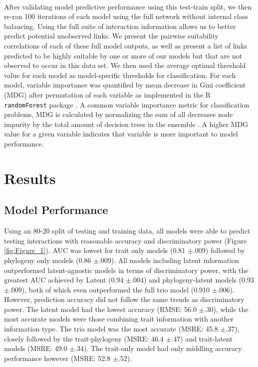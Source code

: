 \documentclass[openacc]{rsproca_new}%
\begin{document}
\paragraph{}
After validating model predictive performance using this test-train split, we then re-ran 100 iterations of each model using the full network without internal class balancing. Using the full suite of interaction information allows us to better predict potential unobserved links. We present the pairwise suitability correlations of each of these full model outputs, as well as present a list of links predicted to be highly suitable by one or more of our models but that are not observed to occur in this data set. We then used the average optimal threshold value for each model as model-specific thresholds for classification. For each model, variable importance was quantified by mean decrease in Gini coefficient  (MDG) after permutation of each variable as implemented in the R \texttt{randomForest} package \cite{randomForest}. A common variable importance metric for classification problems, MDG is calculated by normalizing the sum of all decreases node impurity by the total amount of decision trees in the ensemble \cite{khalilia2011predicting, calle2011stability}. A higher MDG value for a given variable indicates that variable is more important to model performance. 






\section*{Results}

\subsection*{Model Performance}
Using an 80-20 split of testing and training data, all models were able to predict testing interactions with reasonable accuracy and discriminatory power (Figure \ref{fig:Figure_1}). AUC was lowest for trait only models (0.81 $\pm.009$) followed by phylogeny only models (0.86 $\pm .009$). All models including latent information outperformed latent-agnostic models in terms of discriminatory power, with the greatest AUC achieved by Latent (0.94 $\pm .004$) and phylogeny-latent models (0.93 $\pm .009$), both of which even outperformed the full trio model (0.910 $\pm .006$). However, prediction accuracy did not follow the same trends as discriminatory power. The latent model had the lowest accuracy (RMSE: 56.0 $\pm .30$), while the most accurate models were those combining trait information with another information type. The trio model was the most accurate (MSRE: 45.8 $\pm .37$), closely followed by the trait-phylogeny (MSRE: 46.4 $\pm .47$) and trait-latent models (MSRE: 49.0 $\pm .34$). The trait-only model had only middling accuracy performance however (MSRE: 52.8 $\pm .52$).
\end{document}
